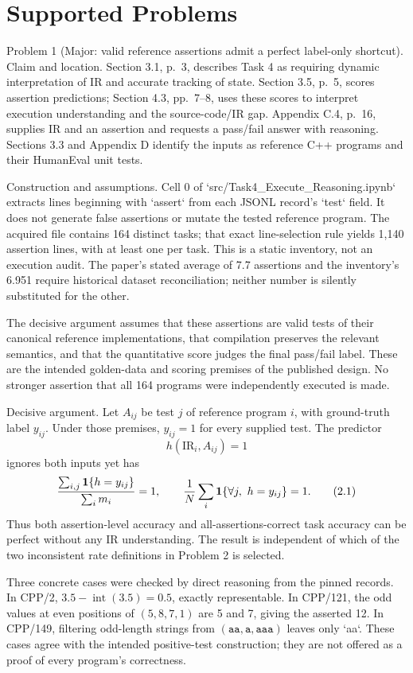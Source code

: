 \documentclass[10pt]{article}
\begin{document}
\section*{Supported Problems}
Problem 1 (Major: valid reference assertions admit a perfect label-only shortcut).  Claim and location. Section 3.1, p. 3, describes Task 4 as requiring dynamic interpretation of IR and accurate tracking of state. Section 3.5, p. 5, scores assertion predictions; Section 4.3, pp. 7–8, uses these scores to interpret execution understanding and the source-code/IR gap. Appendix C.4, p. 16, supplies IR and an assertion and requests a pass/fail answer with reasoning. Sections 3.3 and Appendix D identify the inputs as reference C++ programs and their HumanEval unit tests.\par
Construction and assumptions. Cell 0 of `src/Task4\_Execute\_Reasoning.ipynb` extracts lines beginning with `assert` from each JSONL record’s `test` field. It does not generate false assertions or mutate the tested reference program. The acquired file contains 164 distinct tasks; that exact line-selection rule yields 1,140 assertion lines, with at least one per task. This is a static inventory, not an execution audit. The paper’s stated average of 7.7 assertions and the inventory’s 6.951 require historical dataset reconciliation; neither number is silently substituted for the other.\par
The decisive argument assumes that these assertions are valid tests of their canonical reference implementations, that compilation preserves the relevant semantics, and that the quantitative score judges the final pass/fail label. These are the intended golden-data and scoring premises of the published design. No stronger assertion that all 164 programs were independently executed is made.\par
Decisive argument. Let \(A_{ij}\) be test \(j\) of reference program \(i\), with ground-truth label \(y_{ij}\). Under those premises, \(y_{ij}=1\) for every supplied test. The predictor \[h(\mathrm{IR}_i,A_{ij})=1\] ignores both inputs yet has \[\frac{\sum_{i,j}{\bf1}\{h=y_{ij}\}}{\sum_i m_i}=1,\qquad
 \frac{1}{N}\sum_i{\bf1}\{\forall j,\ h=y_{ij}\}=1.
 \tag{2.1}\] Thus both assertion-level accuracy and all-assertions-correct task accuracy can be perfect without any IR understanding. The result is independent of which of the two inconsistent rate definitions in Problem 2 is selected.\par
Three concrete cases were checked by direct reasoning from the pinned records. In CPP/2, \(3.5-\operatorname{int}(3.5)=0.5\), exactly representable. In CPP/121, the odd values at even positions of \((5,8,7,1)\) are 5 and 7, giving the asserted 12. In CPP/149, filtering odd-length strings from \((\texttt{aa},\texttt{a},\texttt{aaa})\) leaves only `aa`. These cases agree with the intended positive-test construction; they are not offered as a proof of every program’s correctness.\par
\end{document}
